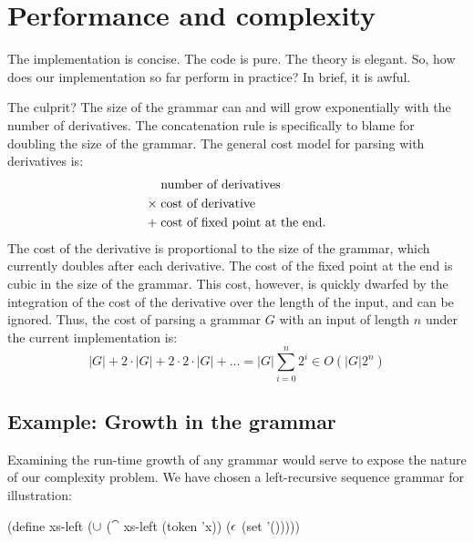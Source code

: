 \section{Performance and complexity}

The implementation is concise.
%
The code is pure.
%
The theory is elegant.
%
So, how does our implementation so far perform in practice?
%
In brief, it is awful.

The culprit?
%
The size of the grammar can and will grow exponentially with the number of
derivatives.
%
The concatenation rule is specifically to blame for doubling the size of the
grammar.
%
The general cost model for parsing with derivatives is:
\begin{align*}
  & \text{number of derivatives} 
 \\
 \times\; & \text{cost of derivative} 
 \\
 +\; & \text{cost of fixed point at the end}
 \text.
\end{align*}
%
The cost of the derivative is proportional to the size of the grammar, which
currently doubles after each derivative.
%
The cost of the fixed point at the end is cubic in the size of the grammar.
%
This cost, however, is quickly dwarfed by the integration of the cost of the
derivative over the length of the input, and can be ignored.
%
Thus, the cost of parsing a grammar $G$ with an input of length $n$ under the
current implementation is:
\begin{equation*}
  |G| + 2 \cdot |G| + 2 \cdot 2 \cdot |G| + ... = |G| \sum_{i=0}^n 2^i \in O(|G|2^n)
\end{equation*}

%
%


\subsection{Example: Growth in the grammar}
%
Examining the run-time growth of any grammar would serve to expose the nature
of our complexity problem.
%
We have chosen a left-recursive sequence grammar for illustration:
%
\begin{code}
(define xs-left
  (\(\cup\) (\(\cat\) xs-left (token 'x))
      \!\!(\(\epsilon\) (set '())))) \end{code}

